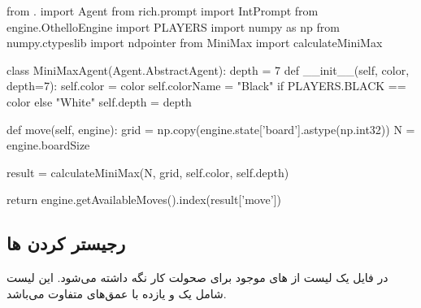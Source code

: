 \begin{latin}
\begin{python}
from . import Agent
from rich.prompt import IntPrompt
from engine.OthelloEngine import PLAYERS
import numpy as np
from numpy.ctypeslib import ndpointer
from MiniMax import calculateMiniMax

class MiniMaxAgent(Agent.AbstractAgent):
    depth = 7
    def __init__(self, color, depth=7):
        self.color = color
        self.colorName = "Black" if PLAYERS.BLACK == color else "White"
        self.depth = depth


    def move(self, engine):
        grid = np.copy(engine.state['board'].astype(np.int32))
        N = engine.boardSize

        result = calculateMiniMax(N, grid, self.color,
                self.depth)

        return engine.getAvailableMoves().index(result['move'])
        

\end{python}
\end{latin}

\subsection{رجیستر کردن ها }

در فایل
یک لیست از 
های موجود برای صحولت کار
نگه داشته می‌شود.
این لیست شامل یک
و 
یازده
با عمق‌های متفاوت می‌باشد.

